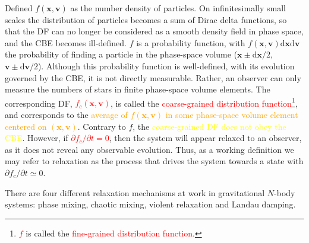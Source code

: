 \documentclass[12pt,a4paper]{article}
\renewcommand{\vec}[1]{\boldsymbol{#1}}
\newcommand{\dif}{\mathrm{d}}
\begin{document}
Defined $f(\vec{x}, \vec{v})$ as the number density of particles. On infinitesimally small scales the distribution of particles becomes a sum of Dirac delta functions, so that the DF can no longer be considered as a smooth density field in phase space, and the CBE becomes ill-defined. $f$ is a probability function, with $f(\vec{x}, \vec{v}) \dif \vec{x} \dif \vec{v}$ the probability of finding a particle in the phase-space volume ($\vec{x} \pm \dif \vec{x}/2$, $\vec{v} \pm \dif \vec{v}/2$). Although this probability function is well-defined, with its evolution governed by the CBE, it is not directly measurable. Rather, an observer can only measure the numbers of stars in finite phase-space volume elements. The corresponding DF, \textcolor{red}{$f_c(\vec{x},\vec{v})$}, is called the \textcolor{red}{coarse-grained distribution function}\footnote{\textcolor{red}{$f$} is called the \textcolor{red}{fine-grained distribution function}.}, and corresponds to the \textcolor{orange}{average of $f(\vec{x},\vec{v})$ in some phase-space volume element centered on $(\vec{x},\vec{v})$}. Contrary to $f$, the \textcolor{yellow}{coarse-grained DF does not obey the CBE}. However, if \textcolor{red}{$\partial f_c/\partial t = 0$}, then the system will appear relaxed to an observer, as it does not reveal any observable evolution. Thus, as a working definition we may refer to relaxation as the process that drives the system towards a state with $\partial f_c/\partial t \simeq 0$.

There are four different relaxation mechanisms at work in gravitational $N$-body systems: phase mixing, chaotic mixing, violent relaxation and Landau damping.
\end{document}
